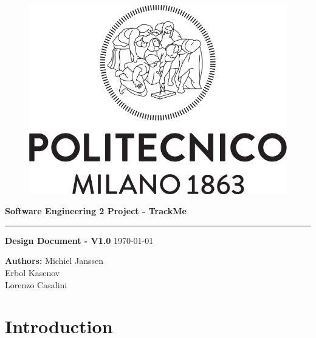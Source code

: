 \documentclass[12pt]{article}
\begin{document}
\begin{titlepage}
    \begin{center}
    \begin{figure}
        \centering
        \includegraphics[scale=0.2]{logoPolimi.png}
        \vspace{1.5cm}
    \end{figure}

    \Huge\textbf{Software Engineering 2 Project - TrackMe}
    \rule{12cm}{0.5pt}
    \Huge\textbf{Design Document - V1.0}
    \vspace{1mm}
    \newline
    \today
    \end{center}
    
    \vspace{3cm}
    
    \begin{flushleft}
        \LARGE\textbf{Authors: }
        \newline\newline
        \Large\texttt{}{Michiel Janssen \\ Erbol Kasenov \\ Lorenzo Casalini}
    \end{flushleft}
\end{titlepage}

\newpage
  \tableofcontents
\newpage
\section{Introduction}
\end{document}
